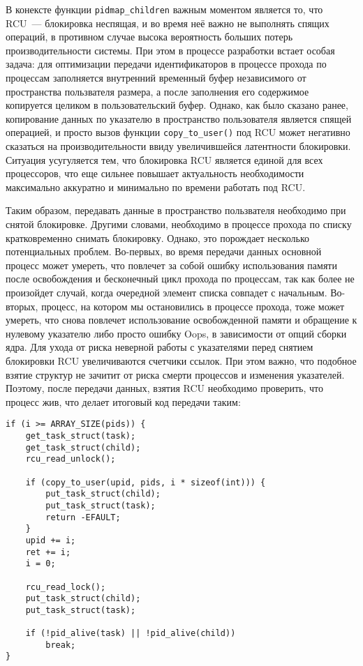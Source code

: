 В конексте функции \texttt{pidmap\_children} важным моментом является то, что
RCU~--- блокировка неспящая, и во время неё важно не выполнять спящих операций,
в противном случае высока вероятность больших потерь производительности системы.
При этом в процессе разработки встает особая задача: для оптимизации передачи
идентификаторов в процессе прохода по процессам заполняется внутренний временный
буфер независимого от пространства пользвателя размера, а после заполнения его
содержимое копируется целиком в пользовательский буфер. Однако, как было сказано
ранее, копирование данных по указателю в пространство пользователя является
спящей операцией, и просто вызов функции \texttt{copy\_to\_user()} под RCU может
негативно сказаться на производительности ввиду увеличившейся латентности
блокировки. Ситуация усугуляется тем, что блокировка RCU является единой для
всех процессоров, что еще сильнее повышает актуальность необходимости
максимально аккуратно и минимально по времени работать под RCU.

Таким образом, передавать данные в пространство пользвателя необходимо при
снятой блокировке. Другими словами, необходимо в процессе прохода по списку
кратковременно снимать блокировку. Однако, это порождает несколько потенциальных
проблем. Во-первых, во время передачи данных основной процесс может умереть, что
повлечет за собой ошибку использования памяти после освобождения и бесконечный
цикл прохода по процессам, так как более не произойдет случай, когда очередной
элемент списка совпадет с начальным. Во-вторых, процесс, на котором мы
остановились в процессе прохода, тоже может умереть, что снова повлечет
использование освобожденной памяти и обращение к нулевому указателю либо просто
ошибку Oops, в зависимости от опций сборки ядра. Для ухода от риска неверной
работы с указателями перед снятием блокировки RCU увеличиваются счетчики ссылок.
При этом важно, что подобное взятие структур не зачитит от риска смерти
процессов и изменения указателей. Поэтому, после передачи данных, взятия RCU
необходимо проверить, что процесс жив, что делает итоговый код передачи таким:
\medskip
\begin{lstlisting}[style=cstyle]
if (i >= ARRAY_SIZE(pids)) {
	get_task_struct(task);
	get_task_struct(child);
	rcu_read_unlock();

	if (copy_to_user(upid, pids, i * sizeof(int))) {
		put_task_struct(child);
		put_task_struct(task);
		return -EFAULT;
	}
	upid += i;
	ret += i;
	i = 0;

	rcu_read_lock();
	put_task_struct(child);
	put_task_struct(task);

	if (!pid_alive(task) || !pid_alive(child))
		break;
}
\end{lstlisting}
\medskip

